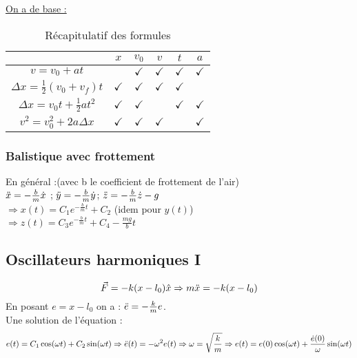 \documentclass[../main.tex]{subfiles}
\begin{document}
\quad \underline{On a de base :}\\
\begin{table}[hbt!]
    \centering
    \begin{tabular}{||c|c|c|c|c|c|}
        \hline
        & $x$ & $v_0$ & $v$ & $t$ & $a$ \\
        \hline
        $v = v_0 + at$ & & $\checkmark$ & $\checkmark$ & $\checkmark$ & $\checkmark$\\
        \hline
        $\Delta x = \frac{1}{2}(v_0 + v_f)t$ & $\checkmark$ & $\checkmark$ & $\checkmark$ & $\checkmark$ & \\
        \hline
        $\Delta x = v_0t + \frac{1}{2} at^2$ & $\checkmark$ & $\checkmark$ & &$\checkmark$ & $\checkmark$\\
        \hline
        $v^2 = v_0^2 + 2a\Delta x$ & $\checkmark$&$\checkmark$&$\checkmark$& &$\checkmark$\\
        \hline
    \end{tabular}
    \caption{Récapitulatif des formules}
    
\end{table}

\subsubsection{Balistique avec frottement}
En général :(avec b le coefficient de frottement de l'air)\\
$\Ddot{x} = -\frac{b}{m} \dot{x}$ ; $\Ddot{y} = -\frac{b}{m} \dot{y}$; $\Ddot{z} = -\frac{b}{m} \dot{z} -g$\\
$\Rightarrow x(t) = C_1 e^{-\frac{b}{m} t} + C_2$ (idem pour $y(t)$)\\
$\Rightarrow z(t) = C_3 e^{-\frac{b}{m} t} + C_4 - \frac{mg}{b} t$\\



\subsection{Oscillateurs harmoniques I}
\begin{equation}
    \vec{F} = -k(x-l_0) \hat{x} \Rightarrow m \Ddot{x} = -k(x-l_0)
\end{equation}
En posant $e = x-l_0$ on a : $\Ddot{e} = -\frac{k}{m} e$.\\
Une solution de l'équation :\\
\begin{equation}
    e(t) = C_1 \cos(\omega t) + C_2 \sin(\omega t) \Rightarrow \Ddot{e}(t) = -\omega^2 e(t) \Rightarrow \omega = \sqrt{\frac{k}{m}} \Rightarrow e(t) = e(0) \cos(\omega t) + \frac{\dot{e}(0)}{\omega} \sin(\omega t)
\end{equation}
\end{document}
